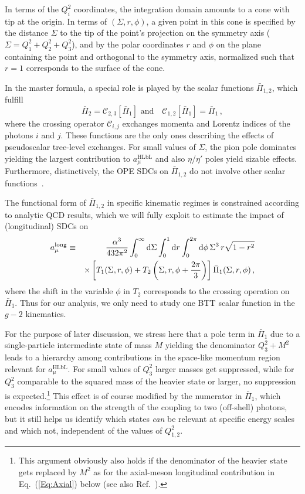 In terms of the $Q_i^2$ coordinates, the integration domain amounts to a cone with tip at the origin. In terms of $(\Sigma, r, \phi)$, a given point in this cone is specified by the distance $\Sigma$ to the tip of the point's projection on the symmetry axis ($\Sigma = Q_1^2+Q_2^2+Q_3^2$), and by the polar coordinates $r$ and $\phi$ on the plane containing the point and orthogonal to the symmetry axis, normalized such that $r = 1$ corresponds to the surface of the cone.

In the master formula, a special role is played by the scalar functions $\bar{\Pi}_{1,2}$, which fulfill
\begin{equation}
\bar{\Pi}_2 = \mathcal{C}_{2,3}[\bar{\Pi}_1] \text{ and}\quad \mathcal{C}_{1,2}[\bar{\Pi}_1] = \bar{\Pi}_1\, ,
\label{Eq:crossing}
\end{equation}
where the crossing operator $\mathcal{C}_{i,j}$ exchanges momenta and Lorentz indices of the photons $i$ and $j$. These functions are the only ones describing the effects of pseudoscalar tree-level exchanges. For small values of $\Sigma$, the pion pole dominates yielding the largest contribution to $a_\mu^{\text{HLbL}}$ and also $\eta$/$\eta'$ poles yield sizable effects. Furthermore, distinctively, the OPE SDCs on $\bar{\Pi}_{1,2}$ do not involve other scalar functions~\cite{BernSDCLong}.

The functional form of $\bar{\Pi}_{1,2}$ in specific kinematic regimes is constrained according to analytic QCD results, which we will fully exploit to estimate the impact of (longitudinal) SDCs on
\begin{eqnarray}
a_\mu^\text{long} & \equiv & \frac{\alpha^3}{432\pi^2}\int_{0}^{\infty} \mathop{}\!\mathrm{d} \Sigma  \int_{0}^{1} \mathop{}\!\mathrm{d} r   \int_{0}^{2\pi} \mathop{}\!\mathrm{d} \phi \,\Sigma^3\, r\sqrt{1-r^2}
\nonumber \\
&& \times \left[T_1(\Sigma, r, \phi) + T_2\left(\Sigma, r, \phi + \frac{2\pi}{3}\right)\right]\bar{\Pi}_1(\Sigma, r, \phi) \,,
\label{Eq:MasterFPi1}
\end{eqnarray}
where the shift in the variable $\phi$ in $T_2$ corresponds to the crossing operation on $\bar{\Pi}_1$. Thus for our analysis, we only need to study one BTT scalar function in the $g-2$ kinematics.

For the purpose of later discussion, we stress here that a pole term in $\bar{\Pi}_1$ due to a single-particle intermediate state of mass $M$ yielding the denominator $Q_3^2 + M^2$ leads to a hierarchy among contributions in the space-like momentum region relevant for $a_\mu^\text{HLbL}$. For small values of $Q_3^2$ larger masses get suppressed, while for $Q_3^2$ comparable to the squared mass of the heavier state or larger, no suppression is expected.\footnote{This argument obviously also holds if the denominator of the heavier state gets replaced by $M^2$ as for the axial-meson longitudinal contribution in Eq.~(\ref{Eq:Axial}) below (see also Ref.~\cite{Masjuan:2020jsf}).} This effect is of course modified by the numerator in $\bar{\Pi}_1$, which encodes information on the strength of the coupling to two (off-shell) photons, but it still helps us identify which states \emph{can} be relevant at specific energy scales and which not, independent of the values of $Q_{1,2}^2$.

